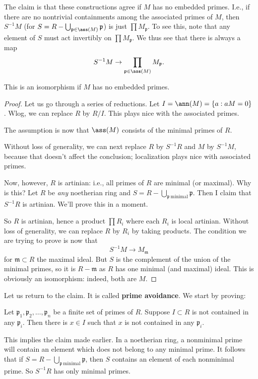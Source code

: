 The claim is that these constructions agree if $M$ has no embedded primes.
I.e., if there are no nontrivial containments among the associated primes of
$M$, then $S^{-1}M$ (for $S =  R - \bigcup_{\mathfrak{p} \in \ass(M)} \mathfrak{p}$)
is just $\prod M_{\mathfrak{p}}$. 
To see this, note that any element of $S$ must act invertibly on $\prod
M_{\mathfrak{p}}$. We thus see that there is always a map
\[ S^{-1}M \to \prod_{\mathfrak{p} \in \ass(M)} M_{\mathfrak{p}} . \]
\begin{proposition} 
This is an isomorphism if $M$ has no embedded primes. 
\end{proposition} 

\begin{proof} 
Let us go through a series of reductions. Let $I = \ann(M) = \left\{a: aM
= 0\right\}$. Wlog, we can replace $R $ by $R/I$. This plays nice with the
associated primes.

The assumption is now that $\ass(M)$ consists of the minimal
primes of $R$.

Without loss of generality, we can next replace $R$ by $S^{-1}R$ and $M$ by
$S^{-1}M$, because that doesn't affect the conclusion; localization plays nice
with associated primes. 

Now, however, $R$ is artinian: i.e., all primes of $R$ are minimal (or maximal). Why is this? 
Let $R$ be \emph{any} noetherian ring and $S = R - \bigcup_{\mathfrak{p} \
\mathrm{minimal}} \mathfrak{p}$. Then I claim that $S^{-1}R$ is artinian. We'll
prove this in a moment. 

So $R$ is artinian, hence a product $\prod R_i$ where each $R_i$ is local
artinian. Without loss of generality, we can replace $R$ by $R_i$ by taking
products. The condition we are trying to prove is now that
\[ S^{-1}M \to M_{\mathfrak{m}}  \]
for $\mathfrak{m} \subset R$ the maximal ideal. But $S$ is the complement of
the union of the minimal primes, so it is $R - \mathfrak{m}$ as $R$ has one
minimal (and maximal) ideal.  This is obviously an isomorphism: indeed, both
are $M$.
\end{proof} 
Let us return to the claim. It is called \textbf{prime avoidance}.
We start by proving:
\begin{proposition} 
Let $\mathfrak{p}_1, \mathfrak{p}_2, \dots, \mathfrak{p}_n$ be a finite set of
primes of $R$. Suppose $I \subset R$ is not contained in any $\mathfrak{p}_i$.
Then there is $x \in I$ such that $x $ is not contained in any $\mathfrak{p}_i$. 
\end{proposition} 
This implies the claim made earlier. In a noetherian ring, a nonminimal prime will contain an element
which does not belong to any minimal prime. It follows that if $S = R -
\bigcup_{\mathfrak{p} \ \mathrm{minimal}} \mathfrak{p}$, then $S$ contains an
element of each nonminimal prime. So $S^{-1}R$ has only minimal primes.

